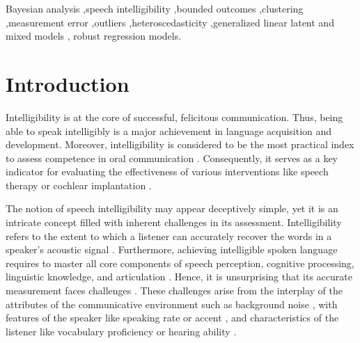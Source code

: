 \documentclass[
  authoryear,
  preprint,
  1p]{elsarticle}
\begin{document}
\begin{frontmatter}
\begin{keyword}
    Bayesian analysis \sep speech intelligibility \sep bounded
outcomes \sep clustering \sep measurement
error \sep outliers \sep heteroscedasticity \sep generalized linear
latent and mixed models \sep 
    robust regression models.
\end{keyword}
\end{frontmatter}
    

\section{Introduction}\label{sec-introduction}

Intelligibility is at the core of successful, felicitous communication.
Thus, being able to speak intelligibly is a major achievement in
language acquisition and development. Moreover, intelligibility is
considered to be the most practical index to assess competence in oral
communication \citep{Kent_et_al_1994}. Consequently, it serves as a key
indicator for evaluating the effectiveness of various interventions like
speech therapy or cochlear implantation \citep{Chin_et_al_2012}.

The notion of speech intelligibility may appear deceptively simple, yet
it is an intricate concept filled with inherent challenges in its
assessment. Intelligibility refers to the extent to which a listener can
accurately recover the words in a speaker's acoustic signal
\citep{Freeman_et_al_2017, vanHeuven_2008, Whitehill_et_al_2004}.
Furthermore, achieving intelligible spoken language requires to master
all core components of speech perception, cognitive processing,
linguistic knowledge, and articulation \citep{Freeman_et_al_2017}.
Hence, it is unsurprising that its accurate measurement faces challenges
\citep{Kent_et_al_1989}. These challenges arise from the interplay of
the attributes of the communicative environment such as background noise
\citep{Munro_1998}, with features of the speaker like speaking rate
\citep{Munro_et_al_1998} or accent
\citep{Jenkins_2000, Ockey_et_al_2016}, and characteristics of the
listener like vocabulary proficiency or hearing ability
\citep{Varonis_et_al_1985}.
\end{document}
